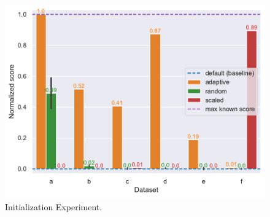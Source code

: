 \begin{figure}
    \centering
    \includegraphics[width=\linewidth]{img/experiments/init_experiment.pdf}
    \caption[Initialization Experiment]{
        Initialization Experiment.
    }
    \label{fig:init_experiment}
\end{figure}
